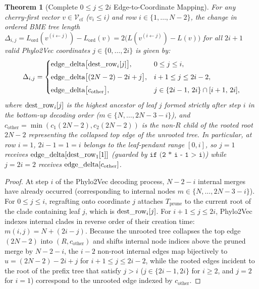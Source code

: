 \documentclass[11pt,a4paper]{article}
\makeatletter
\DeclareRobustCommand{\_}{\ifmmode\nfss@text{\textunderscore}\else\textunderscore\allowbreak\fi}
\newtheorem{theorem}{Theorem}[section]
\theoremstyle{definition}
\makeatother
\begin{document}
\begin{theorem}[Complete $0 \le j \le 2i$ Edge-to-Coordinate Mapping]
\label{thm:full_2i}
For any cherry-first vector $v \in \mathcal{V}_{\text{cf}}$ ($v_i \le i$) and row $i \in \{1, \dots, N-2\}$, the change in ordered BME tree length $\Delta_{i, j} = L_{\text{ord}}(v^{(i \leftarrow j)}) - L_{\text{ord}}(v) = 2\big(L(v^{(i \leftarrow j)}) - L(v)\big)$ for all $2i+1$ valid Phylo2Vec coordinates $j \in \{0, \dots, 2i\}$ is given by:
\begin{equation}
\Delta_{i, j} = \begin{cases}
\text{edge\_delta}\big[\text{dest\_row}_i[j]\big], & 0 \le j \le i, \\[4pt]
\text{edge\_delta}\big[(2N - 2) - 2i + j\big], & i + 1 \le j \le 2i - 2, \\[4pt]
\text{edge\_delta}\big[c_{\text{other}}\big], & j \in \{2i - 1, \, 2i\} \cap [i + 1, \, 2i],
\end{cases}
\label{eq:full_mapping}
\end{equation}
where $\text{dest\_row}_i[j]$ is the highest ancestor of leaf $j$ formed strictly after step $i$ in the bottom-up decoding order ($m \in \{N, \dots, 2N - 3 - i\}$), and $c_{\text{other}} = \min(c_1(2N-2), c_2(2N-2))$ is the non-$R$ child of the rooted root $2N-2$ representing the collapsed top edge of the unrooted tree. In particular, at row $i = 1$, $2i - 1 = 1 = i$ belongs to the leaf-pendant range $[0, i]$, so $j = 1$ receives $\text{edge\_delta}[\text{dest\_row}_1[1]]$ (guarded by $\texttt{if (2 * i - 1 > i)}$) while $j = 2i = 2$ receives $\text{edge\_delta}[c_{\text{other}}]$.
\end{theorem}
\begin{proof}
At step $i$ of the Phylo2Vec decoding process, $N - 2 - i$ internal merges have already occurred (corresponding to internal nodes $m \in \{N, \dots, 2N - 3 - i\}$). For $0 \le j \le i$, regrafting onto coordinate $j$ attaches $T_{\text{prune}}$ to the current root of the clade containing leaf $j$, which is $\text{dest\_row}_i[j]$. For $i+1 \le j \le 2i$, Phylo2Vec indexes internal clades in reverse order of their creation time: $m(i, j) = N + (2i - j)$. Because the unrooted tree collapses the top edge $(2N-2)$ into $(R, c_{\text{other}})$ and shifts internal node indices above the pruned merge by $N - 2 - i$, the $i - 2$ non-root internal edges map bijectively to $u = (2N-2) - 2i + j$ for $i+1 \le j \le 2i-2$, while the rooted edges incident to the root of the prefix tree that satisfy $j > i$ ($j \in \{2i-1, 2i\}$ for $i \ge 2$, and $j = 2$ for $i = 1$) correspond to the unrooted edge indexed by $c_{\text{other}}$.
\end{proof}
\end{document}
